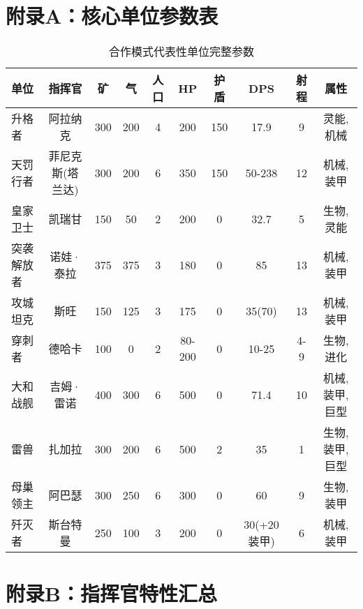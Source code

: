 \documentclass[a4paper,12pt]{article}
\begin{document}
\appendix
\section{附录A：核心单位参数表}

\begin{table}[h]
\centering
\caption{合作模式代表性单位完整参数}
\scriptsize
\begin{tabular}{lccccccccc}
\toprule
\textbf{单位} & \textbf{指挥官} & \textbf{矿} & \textbf{气} & \textbf{人口} & \textbf{HP} & \textbf{护盾} & \textbf{DPS} & \textbf{射程} & \textbf{属性} \\
\midrule
升格者 & 阿拉纳克 & 300 & 200 & 4 & 200 & 150 & 17.9 & 9 & 灵能,机械 \\
天罚行者 & 菲尼克斯(塔兰达) & 300 & 200 & 6 & 350 & 150 & 50-238 & 12 & 机械,装甲 \\
皇家卫士 & 凯瑞甘 & 150 & 50 & 2 & 200 & 0 & 32.7 & 5 & 生物,灵能 \\
突袭解放者 & 诺娃·泰拉 & 375 & 375 & 3 & 180 & 0 & 85 & 13 & 机械,装甲 \\
攻城坦克 & 斯旺 & 150 & 125 & 3 & 175 & 0 & 35(70) & 13 & 机械,装甲 \\
穿刺者 & 德哈卡 & 100 & 0 & 2 & 80-200 & 0 & 10-25 & 4-9 & 生物,进化 \\
大和战舰 & 吉姆·雷诺 & 400 & 300 & 6 & 500 & 0 & 71.4 & 10 & 机械,装甲,巨型 \\
雷兽 & 扎加拉 & 300 & 200 & 6 & 500 & 2 & 35 & 1 & 生物,装甲,巨型 \\
母巢领主 & 阿巴瑟 & 300 & 250 & 6 & 300 & 0 & 60 & 9 & 生物,装甲 \\
歼灭者 & 斯台特曼 & 250 & 100 & 3 & 200 & 0 & 30(+20装甲) & 6 & 机械,装甲 \\
\bottomrule
\end{tabular}
\end{table}

\section{附录B：指挥官特性汇总}
\end{document}

